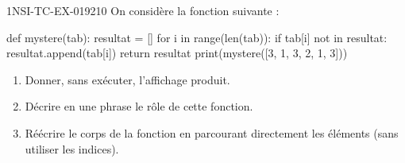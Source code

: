\begin{exercice}{1NSI-TC-EX-019}{2}{10}
On considère la fonction suivante :
\begin{python}
def mystere(tab):
    resultat = []
    for i in range(len(tab)):
        if tab[i] not in resultat:
            resultat.append(tab[i])
    return resultat
print(mystere([3, 1, 3, 2, 1, 3]))
\end{python}
\begin{enumerate}
  \item Donner, sans exécuter, l'affichage produit.
  \item Décrire en une phrase le rôle de cette fonction.
  \item Réécrire le corps de la fonction en parcourant directement les éléments
        (sans utiliser les indices).
\end{enumerate}
\end{exercice}

